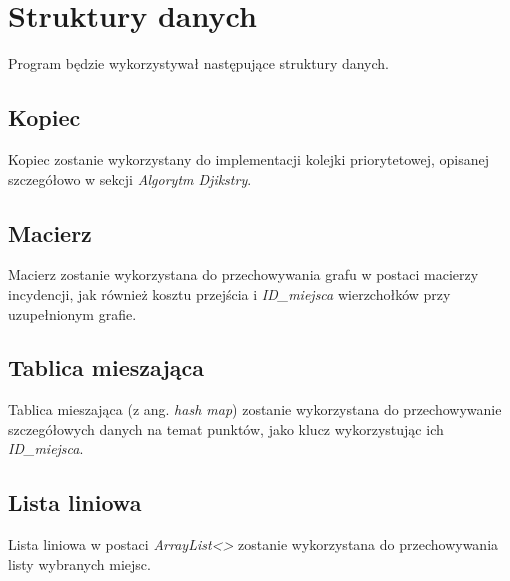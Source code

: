 \documentclass{article}
\begin{document}
\section{Struktury danych}
Program będzie wykorzystywał następujące struktury danych.

\subsection{Kopiec}
    Kopiec zostanie wykorzystany do implementacji kolejki priorytetowej, opisanej szczegółowo w sekcji \textit{Algorytm Djikstry}.
    
\subsection{Macierz}
    Macierz zostanie wykorzystana do przechowywania grafu w postaci macierzy incydencji, jak również kosztu przejścia i \textit{ID\_miejsca} wierzchołków przy uzupełnionym grafie.
    
\subsection{Tablica mieszająca}
    Tablica mieszająca (z ang. \textit{hash map}) zostanie wykorzystana do przechowywanie szczegółowych danych na temat punktów, jako klucz wykorzystując ich \textit{ID\_miejsca}.

\subsection{Lista liniowa}
    Lista liniowa w postaci \textit{ArrayList<>} zostanie wykorzystana do przechowywania listy wybranych miejsc.
\end{document}

